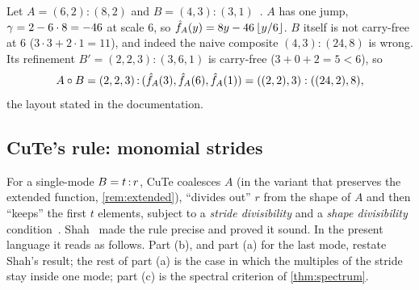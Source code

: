 \begin{example}\label{ex:docs}
Let $A=(6,2):(8,2)$ and $B=(4,3):(3,1)$~\cite{cutedocs}. $A$ has one jump, $\gamma=2-6\cdot8=-46$
at scale $6$, so $\hat{f}_{A}(y)=8y-46\left\lfloor y/6 \right\rfloor$. $B$ itself is not carry-free at $6$
($3\cdot3+2\cdot1=11$), and indeed the naive composite $(4,3):(24,8)$ is wrong. Its refinement
$B'=(2,2,3):(3,6,1)$ is carry-free ($3+0+2=5<6$), so
\[ A\circ B=(2,2,3)\,{:}\,(\hat{f}_{A}(3),\hat{f}_{A}(6),\hat{f}_{A}(1))=((2,2),3):((24,2),8), \]
the layout stated in the documentation.
\end{example}

\subsection{CuTe's rule: monomial strides}\label{sec:cute-rule}

For a single-mode $B=t\,{:}\,r$, CuTe coalesces $A$ (in the variant that preserves the extended
function, \cref{rem:extended}), ``divides out'' $r$ from the shape of $A$ and then ``keeps'' the
first $t$ elements, subject to a \emph{stride divisibility} and a \emph{shape divisibility}
condition~\cite{cutedocs,cecka2026}. Shah~\cite[Defs.~2.11--2.13, Prop.~2.14]{shah2024} made the
rule precise and proved it sound. In the present language it reads as follows. Part (b), and
part (a) for the last mode, restate Shah's result; the rest of part (a) is the case in which the
multiples of the stride stay inside one mode; part (c) is the spectral criterion of
\cref{thm:spectrum}.

